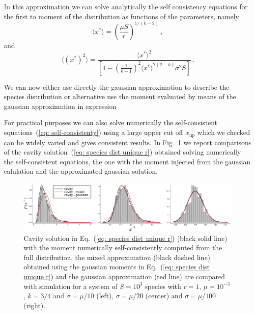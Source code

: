 \documentclass[10pt]{article}
\begin{document}
In this approximation we can solve analytically 
the self consistency equations for the first to moment of the
distribution as functions of the parameters, namely 
\begin{equation}
    \langle x^* \rangle = \left(\frac{ \mu S}{r}\right)^{1/(k-2)} \, ,
\end{equation}
and
\begin{equation}
    \langle (x^*)^2 \rangle = \frac{ \langle x^* \rangle^2}
    {\left[1-\left(\frac{1}{k-1}\right)^2\langle x^* \rangle^{2(2-k)}
    \sigma^2S\right]} \, .
\end{equation}

We can now either use directly the gaussian approximation to describe the
species distribution or alternative use the moment evaluated by means
of the gaussian approximation in expression 

For practical purposes
we can also solve numerically the self-consistent
equations~(\ref{eq: self-consistenty}) using a large
upper cut off $x_{\textrm{up}}$ which we checked can be widely varied
and gives consistent results.
In Fig.~\ref{fig: SM cavity + mixed + gauss} we report comparisons
of the cavity solution~(\ref{eq: species dist unique r}) 
obtained solving numerically the self-consistent equations,
the one with the moment injected from the gaussian calulation and the
approximated gaussian solution.

\begin{figure}[h!]
    \centering
    \includegraphics[width=1\textwidth]{fig/SM-cavity+mixed+gaussian.pdf}
    \caption{Cavity solution in Eq.~(\ref{eq: species dist unique r}) (black solid line) with the
    moment numerically self-consistently computed from the full distribution, 
    the mixed approximation (black dashed line) obtained using the 
    gaussian moments in  Eq.~(\ref{eq: species dist unique r}) and the gaussian approximation (red line)
    are compared with simulation for a system 
    of $S=10^3$ species with
    $r=1$, $\mu=10^{-3}$, $k=3/4$ and $\sigma=\mu/10$ (left),
    $\sigma=\mu/20$ (center) and $\sigma=\mu/100$ (right).}
    \label{fig: SM cavity + mixed + gauss}
\end{figure}
\end{document}
